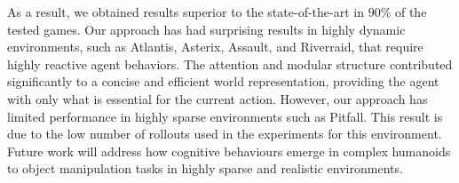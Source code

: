 As a result, we obtained results superior to the state-of-the-art in $90\%$ of the tested games. Our approach has had surprising results in highly dynamic environments, such as Atlantis, Asterix, Assault, and Riverraid, that require highly reactive agent behaviors. The attention and modular structure contributed significantly to a concise and efficient world representation, providing the agent with only what is essential for the current action. However, our approach has limited performance in highly sparse environments such as Pitfall. This result is due to the low number of rollouts used in the experiments for this environment. Future work will address how cognitive behaviours emerge in complex humanoids to object manipulation tasks in highly sparse and realistic environments. 